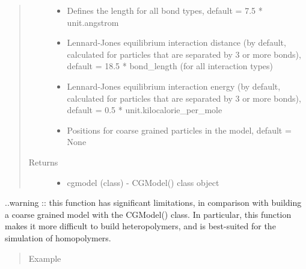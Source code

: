 \documentclass[letterpaper,12pt,english,openany,oneside]{sphinxmanual}
\begin{document}
\begin{fulllineitems}
\begin{quote}
\begin{description}
\begin{itemize}
\item {} 
 \textendash{} Defines the length for all bond types, default = 7.5 * unit.angstrom

\item {} 
 \textendash{} Lennard-Jones equilibrium interaction distance (by default, calculated for particles that are separated by 3 or more bonds), default = 18.5 * bond\_length (for all interaction types)

\item {} 
 \textendash{} Lennard-Jones equilibrium interaction energy (by default, calculated for particles that are separated by 3 or more bonds), default = 0.5 * unit.kilocalorie\_per\_mole

\item {} 
 \textendash{} Positions for coarse grained particles in the model, default = None

\end{itemize}

\item[{Returns}] \leavevmode
\begin{itemize}
\item {} 
cgmodel (class) - CGModel() class object

\end{itemize}


\end{description}\end{quote}

..warning :: this function has significant limitations, in comparison with building a coarse grained model with the CGModel() class.  In particular, this function makes it more difficult to build heteropolymers, and is best-suited for the simulation of homopolymers.
\begin{quote}\begin{description}
\item[{Example}] \leavevmode
\end{description}\end{quote}


\end{fulllineitems}
\end{document}
